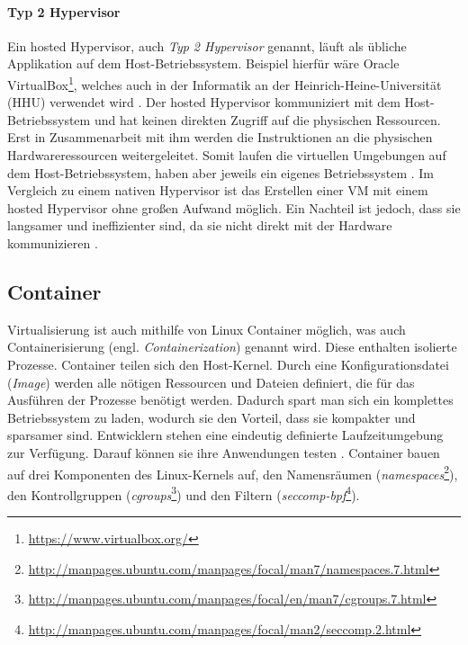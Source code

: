 \paragraph{Typ 2 Hypervisor} Ein hosted Hypervisor, auch
\emph{Typ 2 Hypervisor}  genannt, läuft als übliche
Applikation auf dem Host-Betriebssystem. Beispiel hierfür wäre
Oracle VirtualBox\footnote{\url{https://www.virtualbox.org/}},
welches auch in der Informatik
an der Heinrich-Heine-Universität (HHU) verwendet wird \cite{HHUFachschaft}.
Der hosted Hypervisor kommuniziert mit dem Host-Betriebssystem und hat keinen direkten Zugriff auf die
physischen Ressourcen. Erst in Zusammenarbeit mit ihm
werden die Instruktionen an die physischen Hardwareressourcen weitergeleitet.
Somit laufen die virtuellen Umgebungen auf dem Host-Betriebssystem,
haben aber jeweils ein eigenes Betriebssystem \cite{RedHatHypervisor}.
Im Vergleich zu einem nativen Hypervisor ist das Erstellen einer VM
mit einem hosted Hypervisor ohne großen Aufwand möglich.
Ein Nachteil ist jedoch, dass sie langsamer und ineffizienter sind, da sie nicht
direkt mit der Hardware kommunizieren \cite{IBMHypervisor}.

\subsection{Container}
Virtualisierung ist auch mithilfe von Linux Container möglich,
was auch Containerisierung (engl. \emph{Containerization})
genannt wird. Diese enthalten isolierte Prozesse.
Container teilen sich den Host-Kernel. Durch eine
Konfigurationsdatei (\emph{Image}) werden alle
nötigen Ressourcen und Dateien definiert, die für das Ausführen
der Prozesse benötigt werden. Dadurch spart man sich ein komplettes
Betriebssystem zu laden, wodurch sie den Vorteil,
dass sie kompakter und sparsamer sind. Entwicklern stehen eine eindeutig
definierte Laufzeitumgebung zur Verfügung. Darauf können sie ihre Anwendungen testen
\cite{RedHatContainer}. Container bauen auf drei Komponenten
des Linux-Kernels auf, den Namensräumen
(\emph{namespaces}\footnote{\url{http://manpages.ubuntu.com/manpages/focal/man7/namespaces.7.html}}),
den Kontrollgruppen
(\emph{cgroups}\footnote{\url{http://manpages.ubuntu.com/manpages/focal/en/man7/cgroups.7.html}})
und den Filtern (\emph{seccomp-bpf}\footnote{\url{http://manpages.ubuntu.com/manpages/focal/man2/seccomp.2.html}}).

